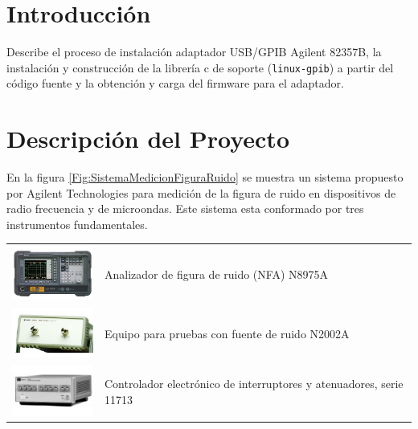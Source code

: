 \documentclass[paper=letter,oneside,fontsize=11pt, parskip=full]{scrartcl}
\begin{document}
	\clearpage
	
	\tableofcontents
		
	\section{Introducción}
		Describe el proceso de instalación adaptador USB/GPIB Agilent 82357B, la instalación y construcción de la librería c de soporte (\texttt{linux-gpib}) a partir del código fuente y la obtención y carga del firmware para el adaptador.
		
	\section{Descripción del Proyecto}
	
	En la figura \ref{Fig:SistemaMedicionFiguraRuido} se muestra un sistema propuesto por Agilent Technologies para medición de la figura de ruido en dispositivos de radio frecuencia y de microondas. Este sistema esta conformado por tres instrumentos fundamentales.
	
	\begin{table}[h!]
		\begin{tabular}{p{3cm}l}
			\begin{minipage}{3cm}
				\includegraphics[width=3cm]{Imagenes/N8975A.pdf}
			\end{minipage} &
			Analizador de figura de ruido (NFA) N8975A \\

			\begin{minipage}{3cm}
				\includegraphics[width=3cm]{Imagenes/N2002A.pdf}
			\end{minipage} &
			Equipo para pruebas con fuente de ruido N2002A \\
			
			\begin{minipage}{3cm}
				\includegraphics[width=3cm]{Imagenes/11713A.pdf}
			\end{minipage} &			
			Controlador electrónico de interruptores y atenuadores, serie 11713 
		\end{tabular}
	\end{table}
\end{document}
